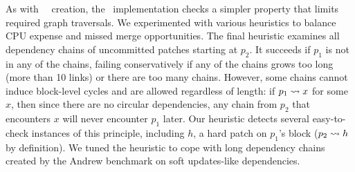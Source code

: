 As with \nrb\ \patch\ creation, the \Kudos\ implementation checks a simpler
property that limits required graph traversals.
%
We experimented with various heuristics to balance CPU expense and missed
merge opportunities.
%
The final heuristic examines all dependency chains of uncommitted patches
starting at $p_2$.  It succeeds if $p_1$ is not in any of the chains,
failing conservatively if any of the chains grows too long (more than 10
links) or there are too many chains.  
%
However, some chains cannot induce block-level cycles and are allowed
regardless of length:
%
if $p_1 \leadsto x$ for some $x$, then
%
since there are no circular dependencies, any chain from $p_2$ that
encounters $x$ will never encounter $p_1$ later.  Our heuristic detects
several easy-to-check instances of this principle, including $h$, a
hard patch on $p_1$'s block ($p_2 \leadsto h$ by definition).
%
We tuned the heuristic to cope with
long dependency chains created by the Andrew benchmark on soft updates-like
dependencies.
%
